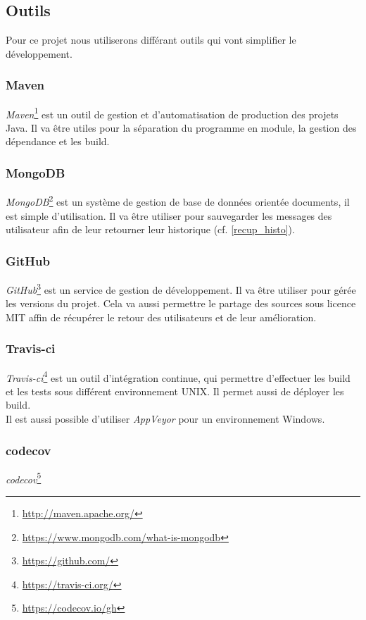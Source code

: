 \documentclass[12pt]{article}
\begin{document}
\subsection{Outils}
Pour ce projet nous utiliserons différant outils qui vont simplifier le développement.

\subsubsection{Maven}
\textit{Maven}\footnote{\url{http://maven.apache.org/}} est un outil de gestion et d'automatisation de production des projets Java. Il va être utiles pour la séparation du programme en module, la gestion des dépendance et les build.

\subsubsection{MongoDB}
\textit{MongoDB}\footnote{\url{https://www.mongodb.com/what-is-mongodb}} est un système de gestion de base de données orientée documents, il est simple d'utilisation. Il va être utiliser pour sauvegarder les messages des utilisateur afin de leur retourner leur historique (cf. \ref{recup_histo}).

\subsubsection{GitHub}
\textit{GitHub}\footnote{\url{https://github.com/}} est un service de gestion de développement. Il va être utiliser pour gérée les versions du projet. Cela va aussi permettre le partage des sources sous licence MIT affin de récupérer le retour des utilisateurs et de leur amélioration.

\subsubsection{Travis-ci}
\textit{Travis-ci}\footnote{\url{https://travis-ci.org/}} est un outil d'intégration continue, qui permettre d'effectuer les build et les tests sous différent environnement UNIX. Il permet aussi de déployer les build.\\
Il est aussi possible d'utiliser \textit{AppVeyor} pour un environnement Windows.

\subsubsection{codecov}
\textit{codecov}\footnote{\url{https://codecov.io/gh}}



\end{document}
